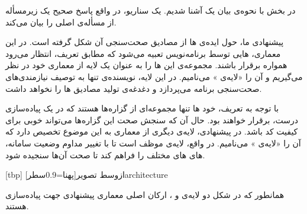 در بخش  با نحوه‌ی بیان یک  آشنا شدیم. یک سناریو، در واقع پاسخ صحیح یک زیرمسأله از مسأله‌ی اصلی را بیان می‌کند.

 پیشنهادی ما، حول ایده‌ی  ‌ها از مصادیق صحت‌سنجی آن شکل گرفته است. در این معماری، ‌هایی توسط برنامه‌نویس تعبیه می‌شود که مطابق تعریف، انتظار می‌رود همواره برقرار باشند. مجموعه‌ی این ‌ها را به عنوان یک لایه از معماری   خود در نظر می‌گیریم و آن را «لایه‌ی » می‌نامیم. در این لایه، نویسنده‌ی  تنها به توصیف نیازمندی‌های صحت‌سنجی برنامه می‌پردازد و دغدغه‌ی تولید مصادیق ‌ها را نخواهد داشت.

با توجه به تعریف، خود ‌ها تنها مجموعه‌ای از گزاره‌ها هستند که در یک پیاده‌سازی درست، برقرار خواهند بود. حال آن که سنجش صحت این گزاره‌ها می‌تواند  خوبی برای کیفیت کد باشد. در  پیشنهادی، لایه‌ی دیگری از معماری  به این موضوع تخصیص دارد که آن را «لایه‌ی » می‌نامیم. در واقع، لایه‌ی  موظف است تا با تغییر مداوم وضعیت سامانه، ‌های ‌های مختلف را فراهم کند تا صحت آن‌ها سنجیده شود.

[tbp]
‌ازوسط
‌تصویر[پهنا=0.9‌سطر]{architecture}

همانطور که در شکل  دو لایه‌ی  و
، ارکان اصلی معماری پیشنهادی جهت پیاده‌سازی 
 هستند. 
